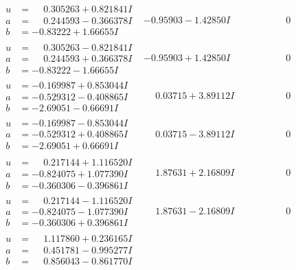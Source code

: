 \documentclass[1p]{elsarticle_modified}
\theoremstyle{definition}
\begin{document}
$$\begin{array}{c|c|c}
\begin{aligned}
u &= \phantom{-}0.305263 + 0.821841 I \\
a &= \phantom{-}0.244593 - 0.366378 I \\
b &= -0.83222 + 1.66655 I\end{aligned}
 & -0.95903 - 1.42850 I & \phantom{-0.000000 } 0 \\ \hline\begin{aligned}
u &= \phantom{-}0.305263 - 0.821841 I \\
a &= \phantom{-}0.244593 + 0.366378 I \\
b &= -0.83222 - 1.66655 I\end{aligned}
 & -0.95903 + 1.42850 I & \phantom{-0.000000 } 0 \\ \hline\begin{aligned}
u &= -0.169987 + 0.853044 I \\
a &= -0.529312 - 0.408865 I \\
b &= -2.69051 - 0.66691 I\end{aligned}
 & \phantom{-}0.03715 + 3.89112 I & \phantom{-0.000000 } 0 \\ \hline\begin{aligned}
u &= -0.169987 - 0.853044 I \\
a &= -0.529312 + 0.408865 I \\
b &= -2.69051 + 0.66691 I\end{aligned}
 & \phantom{-}0.03715 - 3.89112 I & \phantom{-0.000000 } 0 \\ \hline\begin{aligned}
u &= \phantom{-}0.217144 + 1.116520 I \\
a &= -0.824075 + 1.077390 I \\
b &= -0.360306 - 0.396861 I\end{aligned}
 & \phantom{-}1.87631 + 2.16809 I & \phantom{-0.000000 } 0 \\ \hline\begin{aligned}
u &= \phantom{-}0.217144 - 1.116520 I \\
a &= -0.824075 - 1.077390 I \\
b &= -0.360306 + 0.396861 I\end{aligned}
 & \phantom{-}1.87631 - 2.16809 I & \phantom{-0.000000 } 0 \\ \hline\begin{aligned}
u &= \phantom{-}1.117860 + 0.236165 I \\
a &= \phantom{-}0.451781 - 0.995277 I \\
b &= \phantom{-}0.856043 - 0.861770 I\end{aligned}

\end{array}$$
\end{document}
